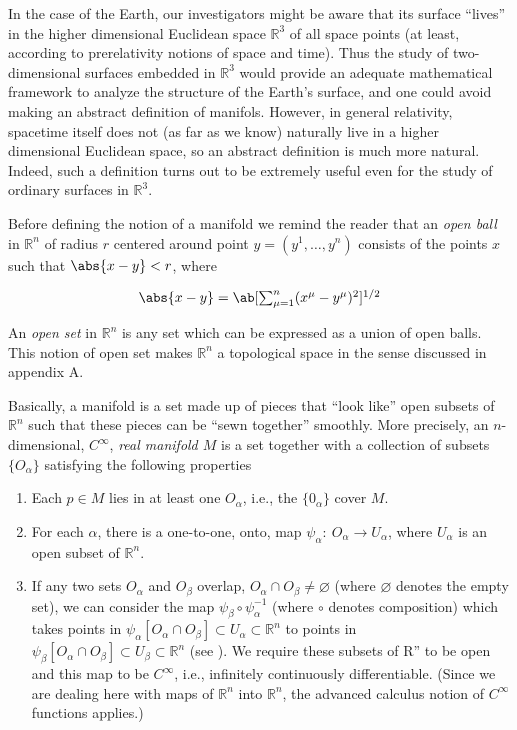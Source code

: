 In the case of the Earth, our investigators might be aware that its surface ``lives'' in the higher dimensional Euclidean space $\mathbb{R}^3$ of all space points (at least, according to prerelativity notions of space and time). Thus the study of two-dimensional surfaces embedded in  $\mathbb{R}^3$ would provide an adequate mathematical framework to analyze the structure of the Earth's surface, and one could avoid making an abstract definition of manifols. However, in general relativity, spacetime itself does not (as far as we know) naturally live in a higher dimensional Euclidean space, so an abstract definition is much more natural. Indeed, such a definition turns out to be extremely useful even for the study of ordinary surfaces in $\mathbb{R}^3$.

Before defining the notion of a manifold we remind the reader that an \emph{open ball} in $\mathbb{R}^n$ of radius $r$ centered around point $y=(y^1,\ldots,y^n)$ consists of the points $x$ such that $\abs{x-y}<r$, where

\[\textstyle\abs{x-y}=\ab[\sum_{\mu=1}^n(x^\mu-y^\mu)^2]^{1/2}\]

An \emph{open set} in $\mathbb{R}^n$ is any set which can be expressed as a union of open balls. This notion of open set makes $\mathbb{R}^n$ a topological space in the sense discussed in appendix A.

Basically, a manifold is a set made up of pieces that ``look like'' open subsets of $\mathbb{R}^n$ such that these pieces can be ``sewn together'' smoothly. More precisely, an $n$-dimensional, $C^\infty$, \emph{real manifold $M$} is a set together with a collection of subsets $\{O_\alpha\}$ satisfying the following properties
\begin{enumerate}[label=(\arabic*)]
    \item Each $p\in M$ lies in at least one $O_\alpha$, i.e., the $\{0_\alpha\}$ cover $M$.
    \item For each $\alpha$, there is a one-to-one, onto, map $\psi_\alpha:\ O_\alpha\to U_\alpha$, where $U_\alpha$ is an open subset of $\mathbb{R}^n$.
    \item If any two sets $O_\alpha$ and $O_\beta$ overlap, $O_\alpha\cap O_\beta\neq\varnothing$ (where $\varnothing$ denotes the empty set), we can consider the map $\psi_\beta\circ\psi_\alpha^{-1}$ (where $\circ$ denotes composition) which takes points in $\psi_\alpha[O_\alpha\cap O_\beta]\subset U_\alpha\subset\mathbb{R}^n$ to points in $\psi_\beta[O_\alpha\cap O_\beta]\subset U_\beta\subset\mathbb{R}^n$ (see ). We require these subsets of R'' to be open and this map to be $C^\infty$, i.e., infinitely continuously differentiable. (Since we are dealing here with maps of $\mathbb{R}^n$ into $\mathbb{R}^n$, the advanced calculus notion of $C^\infty$ functions applies.)
\end{enumerate}

